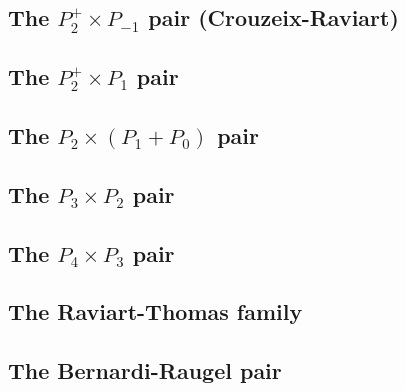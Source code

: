 \subsection{The ${ P}_2^+\times P_{-1}$ pair  (Crouzeix-Raviart) } \label{sec:crouzeix-raviart}


\subsection{The ${ P}_2^+\times P_{1}$ pair \label{ss:p2pp1}}


\subsection{The ${ P}_2\times (P_1+P_0)$ pair} \label{ss:p2p1p0}


\subsection{The ${ P}_3\times P_2$ pair} \label{ss:p3p2}


\subsection{The $P_4\times P_3$ pair} \label{ss:p4p3}



\subsection{The Raviart-Thomas family} \label{ss:raviart_thomas}


\subsection{The Bernardi-Raugel pair} \label{ss:bernardi_raugel}


\newpage
